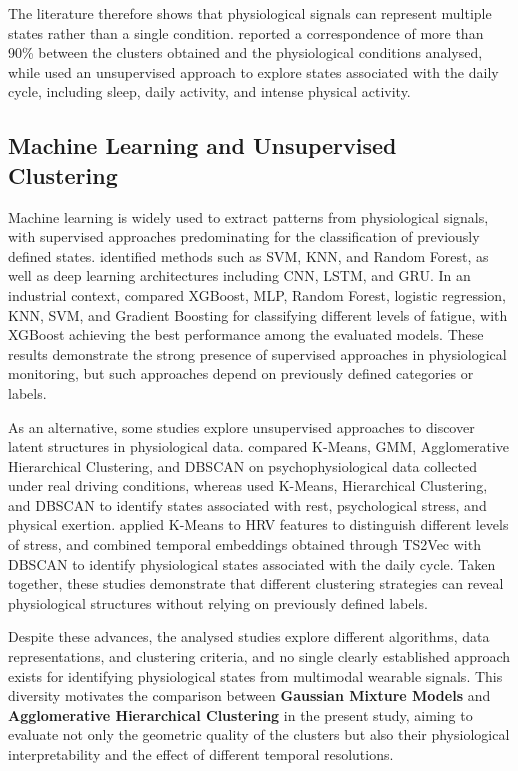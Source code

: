\documentclass[a4paper,fleqn]{cas-sc}
\begin{document}
The literature therefore shows that physiological signals can represent multiple states rather than a single condition. \citet{georgieva2025} reported a correspondence of more than 90\% between the clusters obtained and the physiological conditions analysed, while \citet{arifin2025} used an unsupervised approach to explore states associated with the daily cycle, including sleep, daily activity, and intense physical activity.

\subsection{Machine Learning and Unsupervised Clustering}

Machine learning is widely used to extract patterns from physiological signals, with supervised approaches predominating for the classification of previously defined states. \citet{kakhi2025} identified methods such as SVM, KNN, and Random Forest, as well as deep learning architectures including CNN, LSTM, and GRU. In an industrial context, \citet{albarran2025} compared XGBoost, MLP, Random Forest, logistic regression, KNN, SVM, and Gradient Boosting for classifying different levels of fatigue, with XGBoost achieving the best performance among the evaluated models. These results demonstrate the strong presence of supervised approaches in physiological monitoring, but such approaches depend on previously defined categories or labels.

As an alternative, some studies explore unsupervised approaches to discover latent structures in physiological data. \citet{georgiev2026} compared K-Means, GMM, Agglomerative Hierarchical Clustering, and DBSCAN on psychophysiological data collected under real driving conditions, whereas \citet{georgieva2025} used K-Means, Hierarchical Clustering, and DBSCAN to identify states associated with rest, psychological stress, and physical exertion. \citet{messaoud2025} applied K-Means to HRV features to distinguish different levels of stress, and \citet{arifin2025} combined temporal embeddings obtained through TS2Vec with DBSCAN to identify physiological states associated with the daily cycle. Taken together, these studies demonstrate that different clustering strategies can reveal physiological structures without relying on previously defined labels.

Despite these advances, the analysed studies explore different algorithms, data representations, and clustering criteria, and no single clearly established approach exists for identifying physiological states from multimodal wearable signals. This diversity motivates the comparison between \textbf{Gaussian Mixture Models} and \textbf{Agglomerative Hierarchical Clustering} in the present study, aiming to evaluate not only the geometric quality of the clusters but also their physiological interpretability and the effect of different temporal resolutions.
\end{document}
